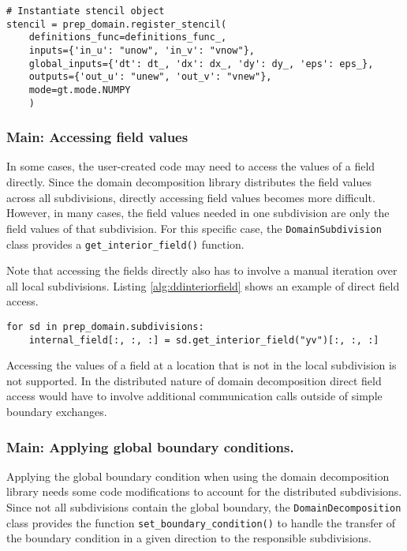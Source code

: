 \begin{lstlisting}[caption={Example code for the same stencil instantiation using the domain decomposition library.},captionpos=b, label={alg:ddstencil}, float, floatplacement=H]
# Instantiate stencil object
stencil = prep_domain.register_stencil(
    definitions_func=definitions_func_,
    inputs={'in_u': "unow", 'in_v': "vnow"},
    global_inputs={'dt': dt_, 'dx': dx_, 'dy': dy_, 'eps': eps_},
    outputs={'out_u': "unew", 'out_v': "vnew"},
    mode=gt.mode.NUMPY
    )
\end{lstlisting}

\subsubsection{Main: Accessing field values}

In some cases, the user-created code may need to access the values of a field directly.
Since the domain decomposition library distributes the field values across all subdivisions, directly accessing field values becomes more difficult.
However, in many cases, the field values needed in one subdivision are only the field values of that subdivision.
For this specific case, the \texttt{DomainSubdivision} class provides a \texttt{get\_interior\_field()} function.

Note that accessing the fields directly also has to involve a manual iteration over all local subdivisions.
Listing \ref{alg:ddinteriorfield} shows an example of direct field access.

\begin{lstlisting}[caption={Example code for accessing the interior field of a subdivision directly.}, captionpos=b, label={alg:ddinteriorfield}, float, floatplacement=H]
for sd in prep_domain.subdivisions:
    internal_field[:, :, :] = sd.get_interior_field("yv")[:, :, :]
\end{lstlisting}

Accessing the values of a field at a location that is not in the local subdivision is not supported.
In the distributed nature of domain decomposition direct field access would have to involve additional communication calls outside of simple boundary exchanges.

\subsubsection{Main: Applying global boundary conditions.}
Applying the global boundary condition when using the domain decomposition library needs some code modifications to account for the distributed subdivisions.
Since not all subdivisions contain the global boundary, the \texttt{DomainDecomposition} class provides the function \texttt{set\_boundary\_condition()} to handle the transfer of the boundary condition in a given direction to the responsible subdivisions.

